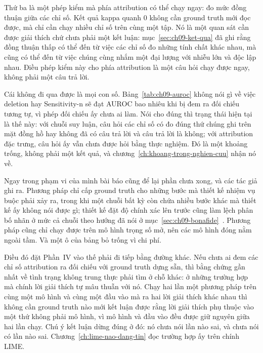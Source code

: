 Thứ ba là một phép kiểm mà phía attribution có thể chạy ngay: đo mức đồng
thuận giữa các chỉ số. Kết quả kappa quanh 0 không cần ground
truth mới đọc được, mà chỉ cần chạy nhiều chỉ số trên cùng một tập. Nó là một
quan sát cần được giải thích chứ chưa phải một kết luận:
mục~\ref{sec:ch09-ket-qua} đã ghi rằng đồng thuận thấp có thể đến từ việc các
chỉ số đo những tính chất khác nhau, mà cũng có thể đến từ việc chúng cùng nhắm
một đại lượng với nhiễu lớn và độc lập nhau. Điều phép kiểm này cho phía
attribution là một câu hỏi chạy được ngay, không phải một câu trả lời.

Cái không đi qua được là mọi con số. Bảng~\ref{tab:ch09-auroc} không
nói gì về việc deletion hay Sensitivity-n sẽ đạt AUROC bao nhiêu khi bị đem ra
đối chiếu tương tự, vì phép đối chiếu ấy chưa ai làm. Nói cho đúng thì trạng
thái hiện tại là thế này: với chuỗi suy luận, câu hỏi các chỉ số có đo đúng
thứ chúng ghi trên mặt đồng hồ hay không đã có câu trả lời và câu trả lời là
không; với attribution đặc trưng, câu hỏi ấy vẫn chưa được hỏi bằng thực
nghiệm. Đó là một khoảng trống, không phải một kết quả, và
chương~\ref{ch:khoang-trong-nghien-cuu} nhận nó về.

Ngay trong phạm vi của mình bài báo cũng để lại phần chưa xong, và các tác giả
ghi ra. Phương pháp chỉ cấp ground truth cho những bước mà thiết kế nhiệm vụ
buộc phải xảy ra, trong khi một chuỗi bất kỳ còn chứa nhiều bước khác mà thiết
kế ấy không nói được gì; thiết kế đặt độ chính xác lên trước cũng làm lệch
phân bố nhãn ở mức cả chuỗi theo hướng đã nói ở
mục~\ref{sec:ch09-bonafide}~\autocite{p21metrics}. Phương pháp cũng chỉ chạy
được trên mô hình trọng số mở, nên các mô hình đóng nằm ngoài tầm. Và một ô
của bảng bỏ trống vì chi phí.

Điều đó đặt Phần~IV vào thế phải đi tiếp bằng đường khác. Nếu chưa ai đem các
chỉ số attribution ra đối chiếu với ground truth dựng sẵn, thì bằng chứng gần
nhất về tình trạng không trung thực phải tìm ở chỗ khác: ở những trường hợp mà
chính lời giải thích tự mâu thuẫn với nó. Chạy hai lần một phương pháp trên
cùng một mô hình và cùng một đầu vào mà ra hai lời giải thích khác nhau thì
không cần ground truth nào mới kết luận được rằng lời giải thích phụ thuộc vào
một thứ không phải mô hình, vì mô hình và đầu vào đều được giữ nguyên giữa hai
lần chạy. Chú ý kết luận dừng đúng ở đó: nó chưa nói lần nào sai, và chưa nói
có lần nào sai. Chương~\ref{ch:lime-nao-dang-tin} đọc trường hợp ấy trên chính
LIME.
